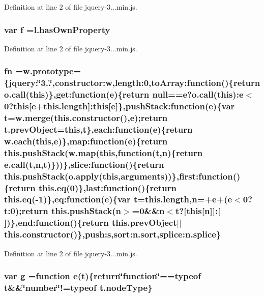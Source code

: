 Definition at line 2 of file jquery-\/3...\+min.\+js.

\subsubsection[{f}]{\setlength{\rightskip}{0pt plus 5cm}var f =l.\+has\+Own\+Property}\label{jquery-3_83_81_8min_8js_a9cf09a2972472098a4c689fd988f4dfc}


Definition at line 2 of file jquery-\/3...\+min.\+js.

\subsubsection[{fn}]{ fn =w.\+prototype=\{jquery\+:\char`\"{}3..\char`\"{},constructor\+:w,length\+:0,to\+Array\+:function()\{return o.\+call(this)\},get\+:function({\bf e})\{return null=={\bf e}?o.\+call(this)\+:{\bf e}$<$0?this[{\bf e}+this.\+length]\+:this[{\bf e}]\},push\+Stack\+:function({\bf e})\{var {\bf t}=w.\+merge(this.\+constructor(),{\bf e});return t.\+prev\+Object=this,{\bf t}\},each\+:function({\bf e})\{return {\bf w.\+each}(this,{\bf e})\},map\+:function({\bf e})\{return this.\+push\+Stack(w.\+map(this,function({\bf t},{\bf n})\{return e.\+call({\bf t},{\bf n},{\bf t})\}))\},slice\+:function()\{return this.\+push\+Stack(o.\+apply(this,arguments))\},first\+:function()\{return this.\+eq(0)\},last\+:function()\{return this.\+eq(-\/1)\},eq\+:function({\bf e})\{var {\bf t}=this.\+length,{\bf n}=+{\bf e}+({\bf e}$<$0?t\+:0);return this.\+push\+Stack({\bf n}$>$=0\&\&{\bf n}$<${\bf t}?[this[{\bf n}]]\+:[$\,$])\},end\+:function()\{return this.\+prev\+Object$\vert$$\vert$this.\+constructor()\},push\+:s,sort\+:n.\+sort,splice\+:n.\+splice\}}\label{jquery-3_83_81_8min_8js_a8a938b10dab9fa9d43908785f7e2c002}


Definition at line 2 of file jquery-\/3...\+min.\+js.

\subsubsection[{g}]{\setlength{\rightskip}{0pt plus 5cm}var g =function {\bf e}({\bf t})\{return\char`\"{}function\char`\"{}==typeof {\bf t}\&\&\char`\"{}number\char`\"{}!=typeof t.\+node\+Type\}}\label{jquery-3_83_81_8min_8js_a103df269476e78897c9c4c6cb8f4eb06}


